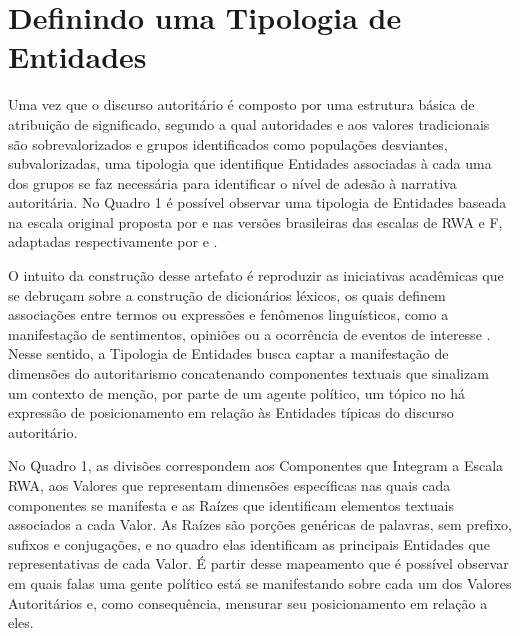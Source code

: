 \documentclass[
12pt,				%
openright,			%
twoside,			%
a4paper,			%
english,			%
french,				%
spanish,			%
brazil				%
]{abntex2}
\begin{document}
\section{Definindo uma Tipologia de Entidades}

Uma vez que o discurso autoritário é composto por uma estrutura básica de atribuição de significado, segundo a qual autoridades e aos valores tradicionais são sobrevalorizados e grupos identificados como populações desviantes, subvalorizadas, uma tipologia que identifique Entidades associadas à cada uma dos grupos se faz necessária para identificar o nível de adesão à narrativa autoritária. No Quadro 1 é possível observar uma tipologia de Entidades baseada na escala original proposta por  e nas versões brasileiras das escalas de RWA e F, adaptadas respectivamente por  e . 

O intuito da construção desse artefato é reproduzir as iniciativas acadêmicas que se debruçam sobre a construção de dicionários léxicos, os quais definem associações entre termos ou expressões e fenômenos linguísticos, como a manifestação de sentimentos, opiniões ou a ocorrência de eventos de interesse \cite{freitas2012vampiro, freitas2013construccao, freitas2014sparkling}. Nesse sentido, a Tipologia de Entidades busca captar a manifestação de dimensões do autoritarismo concatenando componentes textuais que sinalizam um contexto de menção, por parte de um agente político, um tópico no há expressão de posicionamento em relação às Entidades típicas do discurso autoritário.

No Quadro 1, as divisões correspondem aos Componentes que Integram a Escala RWA, aos Valores que representam dimensões específicas nas quais cada componentes se manifesta e as Raízes que identificam elementos textuais associados a cada Valor. As Raízes são porções genéricas de palavras, sem prefixo, sufixos e conjugações, e no quadro elas identificam as principais Entidades que representativas de cada Valor. É partir desse mapeamento que é possível observar em quais falas uma gente político está se manifestando sobre cada um dos Valores Autoritários e, como consequência, mensurar seu posicionamento em relação a eles.
\end{document}
